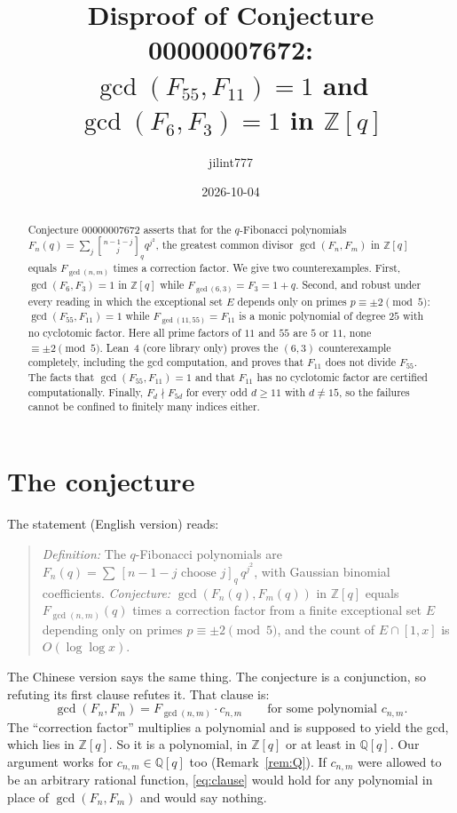 \documentclass[11pt]{article}
\title{Disproof of Conjecture 00000007672:\\
$\gcd(F_{55},F_{11})=1$ and $\gcd(F_6,F_3)=1$ in $\mathbb Z[q]$}
\author{jilint777}
\date{2026-10-04}
\theoremstyle{remark}
\newcommand{\qbinom}[2]{\genfrac{[}{]}{0pt}{}{#1}{#2}_q}
\begin{document}
\sloppy
\maketitle

\begin{abstract}
Conjecture 00000007672 asserts that for the $q$-Fibonacci polynomials
$F_n(q)=\sum_j\qbinom{n-1-j}{j}q^{j^2}$, the greatest common divisor
$\gcd(F_n,F_m)$ in $\mathbb Z[q]$ equals $F_{\gcd(n,m)}$ times a correction
factor. We give two counterexamples. First, $\gcd(F_6,F_3)=1$ in
$\mathbb Z[q]$ while $F_{\gcd(6,3)}=F_3=1+q$. Second, and robust under every reading in which the
exceptional set $E$ depends only on primes $p\equiv\pm2\pmod5$:
$\gcd(F_{55},F_{11})=1$ while
$F_{\gcd(11,55)}=F_{11}$ is a monic polynomial of degree $25$ with no
cyclotomic factor. Here all prime factors of $11$ and $55$ are $5$ or $11$,
none $\equiv\pm2\pmod 5$. Lean~4 (core library only) proves the $(6,3)$
counterexample completely, including the gcd computation, and proves that
$F_{11}$ does not divide $F_{55}$. The facts that $\gcd(F_{55},F_{11})=1$ and
that $F_{11}$ has no cyclotomic factor are certified computationally. Finally,
$F_d\nmid F_{5d}$ for every odd $d\ge11$ with $d\ne15$, so the failures cannot be
confined to finitely many indices either.
\end{abstract}

\section{The conjecture}

The statement (English version) reads:
\begin{quote}
\emph{Definition:} The $q$-Fibonacci polynomials are
$F_n(q)=\sum\,[n-1-j \text{ choose } j]_q\, q^{j^2}$, with Gaussian binomial
coefficients. \emph{Conjecture:} $\gcd(F_n(q),F_m(q))$ in $\mathbb Z[q]$ equals
$F_{\gcd(n,m)}(q)$ times a correction factor from a finite exceptional set $E$
depending only on primes $p\equiv\pm2 \pmod 5$, and the count of
$E\cap[1,x]$ is $O(\log\log x)$.
\end{quote}
The Chinese version says the same thing. The conjecture is a conjunction, so
refuting its first clause refutes it. That clause is:
\begin{equation}\label{eq:clause}
\gcd(F_n,F_m)=F_{\gcd(n,m)}\cdot c_{n,m}\qquad\text{for some polynomial } c_{n,m}.
\end{equation}
The ``correction factor'' multiplies a polynomial and is supposed to yield the
gcd, which lies in $\mathbb Z[q]$. So it is a polynomial, in $\mathbb Z[q]$ or at
least in $\mathbb Q[q]$. Our argument works for $c_{n,m}\in\mathbb Q[q]$ too
(Remark~\ref{rem:Q}). If $c_{n,m}$ were allowed to be an arbitrary rational
function, \eqref{eq:clause} would hold for any polynomial in place of
$\gcd(F_n,F_m)$ and would say nothing.
\end{document}
